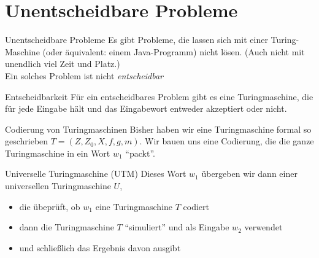 \section{Unentscheidbare Probleme}
\begin{frame}{Unentscheidbare Probleme}
    Es gibt Probleme, die lassen sich mit einer Turing-Maschine (oder äquivalent: einem Java-Programm) nicht lösen. (Auch nicht mit unendlich viel Zeit und Platz.)\\
    Ein solches Problem ist nicht \emph{entscheidbar}
    \begin{block}{Entscheidbarkeit}
        Für ein entscheidbares Problem gibt es eine Turingmaschine, die für jede Eingabe hält und das Eingabewort entweder akzeptiert oder nicht.
    \end{block}
\end{frame}
\begin{frame}{Codierung von Turingmaschinen}
   Bisher haben wir eine Turingmaschine formal so geschrieben $T = \left( Z, Z_0, X, f, g, m \right)$. Wir bauen uns eine Codierung, die die ganze Turingmaschine in ein Wort $w_1$ ``packt''. \\
   \pause
   \begin{block}{Universelle Turingmaschine (UTM)}
       Dieses Wort $w_1$ übergeben wir dann einer universellen Turingmaschine $U$,
       \begin{itemize}
           \item die übeprüft, ob $w_1$ eine Turingmaschine $T$ codiert
           \item dann die Turingmaschine $T$ ``simuliert'' und als Eingabe $w_2$ verwendet
           \item und schließlich das Ergebnis davon ausgibt
       \end{itemize}
   \end{block}
\end{frame}

